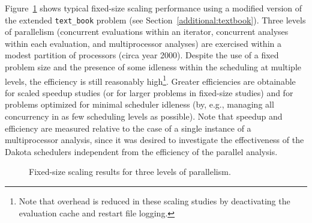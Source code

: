 Figure~\ref{fig:mlp_scaling} shows typical fixed-size scaling
performance using a modified version of the extended
\texttt{text\_book} problem (see Section~\ref{additional:textbook}).
Three levels of parallelism (concurrent evaluations within an
iterator, concurrent analyses within each evaluation, and
multiprocessor analyses) are exercised within a modest partition of
processors (circa year 2000).  Despite the use of a fixed problem size
and the presence of some idleness within the scheduling at multiple
levels, the efficiency is still reasonably high\footnote{Note that
  overhead is reduced in these scaling studies by deactivating the
  evaluation cache and restart file logging.}.  Greater efficiencies
are obtainable for scaled speedup studies (or for larger problems in
fixed-size studies) and for problems optimized for minimal scheduler
idleness (by, e.g., managing all concurrency in as few scheduling
levels as possible).  Note that speedup and efficiency are measured
relative to the case of a single instance of a multiprocessor
analysis, since it was desired to investigate the effectiveness of the
Dakota schedulers independent from the efficiency of the parallel
analysis.
\begin{figure}[ht]
  \centering
  \caption{Fixed-size scaling results for three levels of parallelism.}
  \label{fig:mlp_scaling}
\end{figure}

